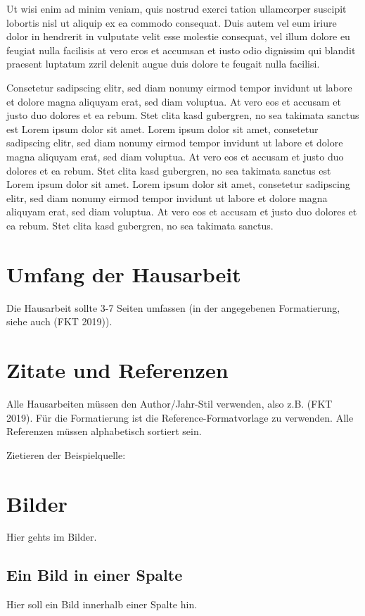 Ut wisi enim ad minim veniam, quis nostrud exerci tation ullamcorper suscipit lobortis nisl ut aliquip ex ea commodo consequat. Duis autem vel eum iriure dolor in hendrerit in vulputate velit esse molestie consequat, vel illum dolore eu feugiat nulla facilisis at vero eros et accumsan et iusto odio dignissim qui blandit praesent luptatum zzril delenit augue duis dolore te feugait nulla facilisi.   


Consetetur sadipscing elitr, sed diam nonumy eirmod tempor invidunt ut labore et dolore magna aliquyam erat, sed diam voluptua. At vero eos et accusam et justo duo dolores et ea rebum. Stet clita kasd gubergren, no sea takimata sanctus est Lorem ipsum dolor sit amet. Lorem ipsum dolor sit amet, consetetur sadipscing elitr, sed diam nonumy eirmod tempor invidunt ut labore et dolore magna aliquyam erat, sed diam voluptua. At vero eos et accusam et justo duo dolores et ea rebum. Stet clita kasd gubergren, no sea takimata sanctus est Lorem ipsum dolor sit amet. Lorem ipsum dolor sit amet, consetetur sadipscing elitr, sed diam nonumy eirmod tempor invidunt ut labore et dolore magna aliquyam erat, sed diam voluptua. At vero eos et accusam et justo duo dolores et ea rebum. Stet clita kasd gubergren, no sea takimata sanctus.  

\section{Umfang der Hausarbeit}
Die Hausarbeit sollte 3-7 Seiten umfassen (in der angegebenen Formatierung, siehe auch (FKT 2019)).
\section{Zitate und Referenzen}
Alle Hausarbeiten müssen den Author/Jahr-Stil verwenden, also z.B. (FKT 2019).
Für die Formatierung ist die Reference-Formatvorlage zu verwenden. Alle Referenzen müssen alphabetisch sortiert sein.

Zietieren der Beispielquelle: \cite{beispiel}

\section{Bilder}
Hier gehts im Bilder.
\subsection{Ein Bild in einer Spalte}
Hier soll ein Bild innerhalb einer Spalte hin.


